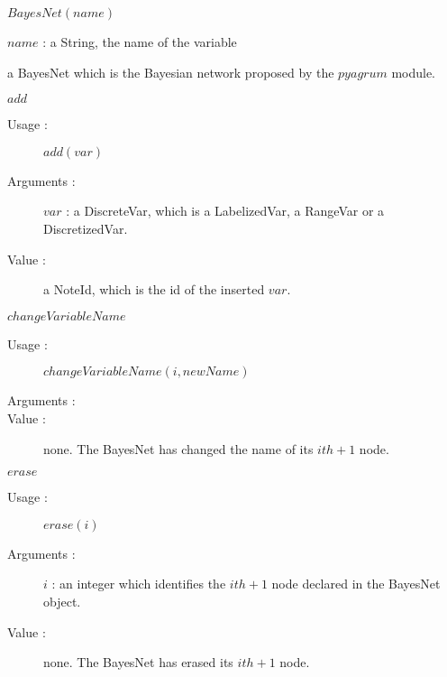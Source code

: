 \begin{description}
\item[Usage :]  $BayesNet(name)$

\item[Arguments :] $name$ : a String, the name of the variable

\item[Value :]    a  BayesNet which is the Bayesian network proposed by the $pyagrum$ module.

\item[Some methods :]  \strut

  \begin{description}

 

  \item $add$
    \begin{description}
    \item[Usage :]  $add(var)$
    \item[Arguments :] $var$ : a DiscreteVar, which is a LabelizedVar, a RangeVar or a DiscretizedVar.
    \item[Value :]  a NoteId, which is the id of the inserted $var$.
    \end{description}
    \bigskip

   \item $changeVariableName$
    \begin{description}
    \item[Usage :]  $changeVariableName(i, newName)$
    \item[Arguments :] \strut
    \item[Value :] none. The BayesNet has changed the name of its  $ith + 1$ node.
    \end{description}
    \bigskip

   \item $erase$
    \begin{description}
    \item[Usage :]  $erase(i)$
    \item[Arguments :] $i$ : an integer which identifies the $ith + 1$ node declared in the BayesNet object.
    \item[Value :] none. The BayesNet has erased its  $ith + 1$ node.
    \end{description}
    \bigskip


\end{description}
\end{description}
